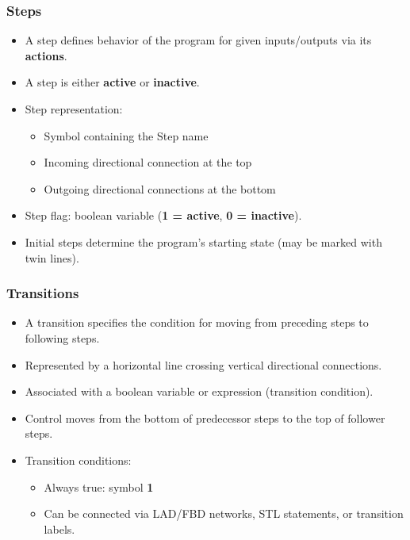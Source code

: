 \begin{frame}
	\frametitle{Steps}
	\begin{itemize}
		\item A step defines behavior of the program for given inputs/outputs via its \textbf{actions}.
		\item A step is either \textbf{active} or \textbf{inactive}.
		\item Step representation:
		\begin{itemize}
			\item Symbol containing the Step name
			\item Incoming directional connection at the top
			\item Outgoing directional connections at the bottom
		\end{itemize}
		\item Step flag: boolean variable (\textbf{1 = active}, \textbf{0 = inactive}).
		\item Initial steps determine the program's starting state (may be marked with twin lines).
	\end{itemize}
\end{frame}

\begin{frame}
	\frametitle{Transitions}
	\begin{itemize}
		\item A transition specifies the condition for moving from preceding steps to following steps.
		\item Represented by a horizontal line crossing vertical directional connections.
		\item Associated with a boolean variable or expression (transition condition).
		\item Control moves from the bottom of predecessor steps to the top of follower steps.
		\item Transition conditions:
		\begin{itemize}
			\item Always true: symbol \textbf{1}
			\item Can be connected via LAD/FBD networks, STL statements, or transition labels.
		\end{itemize}
	\end{itemize}
\end{frame}

